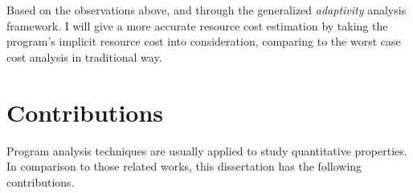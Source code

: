    Based on the observations above, and through the generalized \emph{adaptivity} analysis framework.
   I will give
   a more accurate resource cost estimation by taking the program's implicit resource cost into consideration, comparing 
   to the worst case cost analysis in traditional way.


   \section{Contributions}

   Program analysis techniques are usually applied to study quantitative properties. In comparison to those related works, this dissertation has the following contributions.
   
